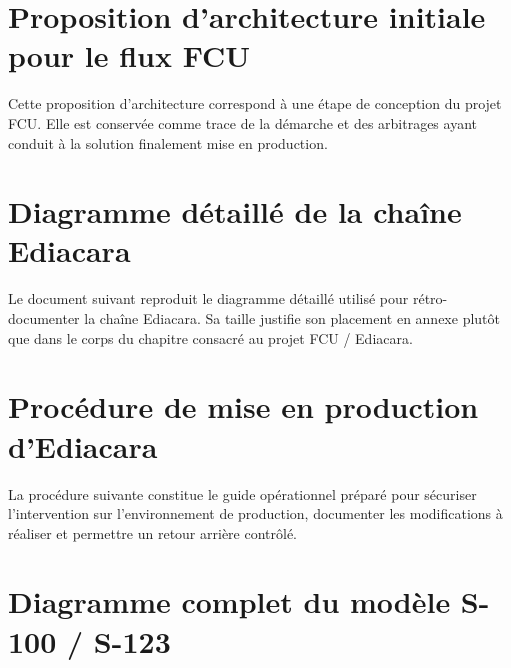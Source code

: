 
\chapter{Proposition d'architecture initiale pour le flux FCU}
\label{ann:fcu-architecture}

Cette proposition d'architecture correspond à une étape de conception du projet FCU. Elle est conservée comme trace de la démarche et des arbitrages ayant conduit à la solution finalement mise en production.



\chapter{Diagramme détaillé de la chaîne Ediacara}
\label{ann:ediacara-diagramme}

Le document suivant reproduit le diagramme détaillé utilisé pour rétro-documenter la chaîne Ediacara. Sa taille justifie son placement en annexe plutôt que dans le corps du chapitre consacré au projet FCU / Ediacara.



\chapter{Procédure de mise en production d'Ediacara}
\label{ann:fcu-mep}

La procédure suivante constitue le guide opérationnel préparé pour sécuriser l'intervention sur l'environnement de production, documenter les modifications à réaliser et permettre un retour arrière contrôlé.



\chapter{Diagramme complet du modèle S-100 / S-123}
\label{ann:s123-modele}

